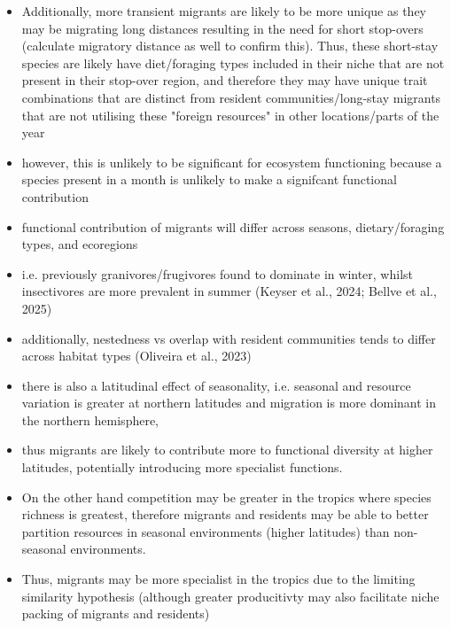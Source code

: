 \documentclass[11pt]{report}
\begin{document}
\begin{itemize}
\item Additionally, more transient migrants are likely to be more unique as they may be migrating long distances resulting in the need for short stop-overs (calculate migratory distance as well to confirm this). Thus, these short-stay species are likely have diet/foraging types included in their niche that are not present in their stop-over region, and therefore they may have unique trait combinations that are distinct from resident communities/long-stay migrants that are not utilising these "foreign resources" in other locations/parts of the year 
\item however, this is unlikely to be significant for ecosystem functioning because a species present in a month is unlikely to make a signifcant functional contribution
\end{itemize}

\begin{itemize}
\item functional contribution of migrants will differ across seasons, dietary/foraging types, and ecoregions
\item i.e. previously granivores/frugivores found to dominate in winter, whilst insectivores are more prevalent in summer (Keyser et al., 2024; Bellve et al., 2025)
\item additionally, nestedness vs overlap with resident communities tends to differ across habitat types (Oliveira et al., 2023)
\end{itemize}

\begin{itemize}
\item there is also a latitudinal effect of seasonality, i.e. seasonal and resource variation is greater at northern latitudes and migration is more dominant in the northern hemisphere,
\item thus migrants are likely to contribute more to functional diversity at higher latitudes, potentially introducing more specialist functions.
\item On the other hand competition may be greater in the tropics where species richness is greatest, therefore migrants and residents may be able to better partition resources in seasonal environments (higher latitudes) than non-seasonal environments.
\item Thus, migrants may be more specialist in the tropics due to the limiting similarity hypothesis (although greater producitivty may also facilitate niche packing of migrants and residents)
\end{itemize}
\end{document}
